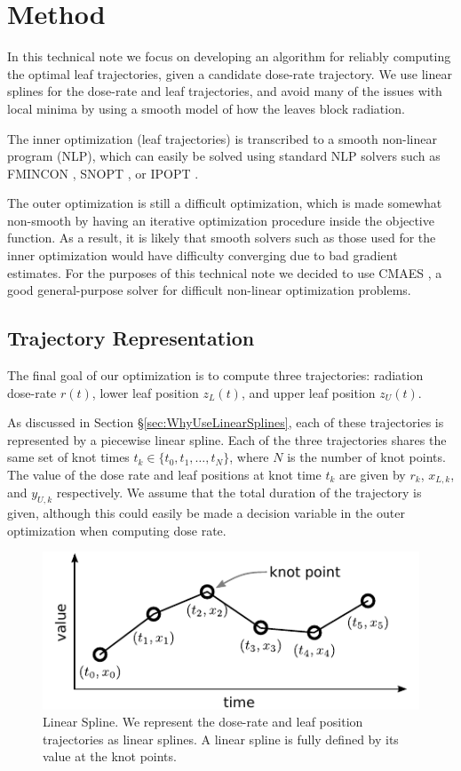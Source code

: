 \section{Method}

In this technical note we focus on developing an algorithm for reliably computing the optimal
leaf trajectories, given a candidate dose-rate trajectory.
We use linear splines for the dose-rate and leaf trajectories,
and avoid many of the issues with local minima by using a smooth model of how the leaves block radiation.

The inner optimization (leaf trajectories) is transcribed to a smooth non-linear program (NLP),
which can easily be solved using standard NLP solvers such as
FMINCON \cite{MatlabOptimizationToolbox2014}, SNOPT \cite{Snopt7}, or IPOPT \cite{Wachter2006}.

The outer optimization is still a difficult optimization, which is made somewhat non-smooth by
having an iterative optimization procedure inside the objective function.
As a result, it is likely that smooth solvers such as those used for the inner optimization would
have difficulty converging due to bad gradient estimates.
For the purposes of this technical note we decided to use CMAES \cite{Hansen2001},
a good general-purpose solver for difficult non-linear optimization problems.

\subsection{Trajectory Representation}

The final goal of our optimization is to compute three trajectories:
radiation dose-rate $r(t)$, lower leaf position $z_L(t)$, and upper leaf position $z_U(t)$.

As discussed in Section \S \ref{sec:WhyUseLinearSplines}, each of these trajectories is
represented by a piecewise linear spline. Each of the three trajectories shares the same set of
knot times $t_k \in \{t_0, t_1, \dots, t_N\}$, where $N$ is the number of knot points.
The value of the dose rate and leaf positions at knot time $t_k$ are given by
$r_k$, $x_{L,k}$, and $y_{U,k}$ respectively.
We assume that the total duration of the trajectory is given, although this could easily be made
a decision variable in the outer optimization when computing dose rate.

\begin{figure}
  \centering
  \includegraphics{fig/linearSpline.pdf}
  \caption{Linear Spline. We represent the dose-rate and leaf position trajectories as linear
           splines. A linear spline is fully defined by its value at the knot points. }
  \label{fig:linearSpline}
\end{figure}

